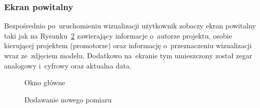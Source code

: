 \subsubsection{Ekran powitalny}
Bezpośrednio po~uruchomieniu wizualizacji użytkownik zobaczy ekran powitalny taki jak na Rysunku~\ref{main} zawierający informacje o~autorze projektu, osobie kierującej projektem (promotorze) oraz informację o~przeznaczeniu wizualizacji wraz ze~zdjęciem modelu. Dodatkowo na~ekranie tym umieszczony został zegar analogowy i~cyfrowy oraz aktualna data.
\begin{figure}[!htb]
\centering 		
  \hspace{2mm}          
\caption{Okno główne} 	
\label{main}
\end{figure}

\begin{figure}[!htb]
\centering 		
  \hspace{2mm}
\caption{Dodawanie nowego pomiaru} 	
\label{main}
\end{figure}

